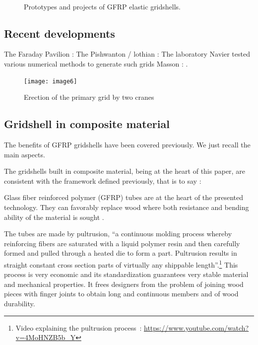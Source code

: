 \begin{figure}[h]
	\centering
		\captionsetup[subfloat]{captionskip=10pt}
		\\ \vspace{1cm}
		\vspace{10pt}
		\caption{Prototypes and projects of GFRP elastic gridshells.}
		\label{fig:proto}    
\end{figure}




\subsection{Recent developments}
The Faraday Pavilion : \cite{Nicholas2013}
The Pishwanton / lothian : \cite{Pishwanton2003}
The laboratory Navier tested various numerical methods to generate such grids \cite{Bouhaya2009}
Masson :  \cite{Masson2017}.
\begin{figure}[t]
	\centering
		\texttt{[image: image6]}
	\caption{Erection of the primary grid by two cranes}
	\label{fig:5}
\end{figure}



\subsection{Gridshell in composite material}

The benefits of GFRP gridshells have been covered previously. We just recall the main aspects.

The gridshells built in composite material, being at the heart of this paper, are consistent with the framework defined previously, that is to say :


Glass fiber reinforced polymer (GFRP) tubes are at the heart of the presented technology. They can favorably replace wood where both resistance and bending ability of the material is sought \cite{Douthe2010}. 

The tubes are made by pultrusion, \enquote{a continuous molding process whereby reinforcing fibers are saturated with a liquid polymer resin and then carefully formed and pulled through a heated die to form a part. Pultrusion results in straight constant cross section parts of virtually any shippable length}.\footnote{Video explaining the pultrusion process~: \url{https://www.youtube.com/watch?v=4MoHNZB5b_Y}} This process is very economic and its standardization guarantees very stable material and mechanical properties. It frees designers from the problem of joining wood pieces with finger joints to obtain long and continuous members and of wood durability. 



